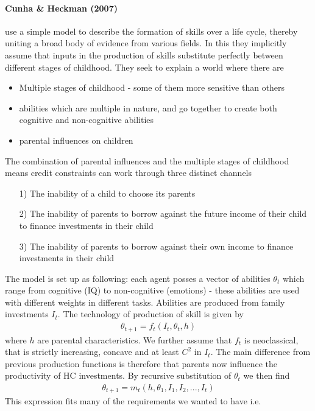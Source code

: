 \documentclass[12pt, a4paper]{article}
\begin{document}
\begin{multicols}{2}
\paragraph{Cunha \& Heckman (2007)} use a simple model to describe the formation of skills over a life cycle, thereby uniting a broad body of evidence from various fields. In this they implicitly assume that inputs in the production of skills substitute perfectly between different stages of childhood. They seek to explain a world where there are
\begin{itemize}
\item Multiple stages of childhood - some of them more sensitive than others
\item abilities which are multiple in nature, and go together to create both cognitive and non-cognitive abilities
\item parental influences on children
\end{itemize}
The combination of parental influences and the multiple stages of childhood means credit constraints can work through three distinct channels
\begin{itemize}
\item[1)] The inability of a child to choose its parents
\item[2)] The inability of parents to borrow against the future income of their child to finance investments in their child
\item[3)] The inability of parents to borrow against their own income to finance investments in their child
\end{itemize}
The model is set up as following: each agent posses a vector of abilities $\theta_t$ which range from cognitive (IQ) to non-cognitive (emotions) - these abilities are used with different weights in different tasks. Abilities are produced from family investments $I_t$. The technology of production of skill is given by
\begin{align*}
\theta_{t+1} = f_t(I_t, \theta_t, h)
\end{align*}
where $h$ are parental characteristics. We further assume that $f_t$ is neoclassical, that is strictly increasing, concave and at least $C^2$ in $I_t$. The main difference from previous production functions is therefore that parents now influence the productivity of HC investments. By recursive substitution of $\theta_t$ we then find
\begin{align*}
\theta_{t+1} = m_t(h, \theta_1, I_1, I_2, ..., I_t)
\end{align*}
This expression fits many of the requirements we wanted to have i.e.

\end{multicols}
\end{document}
